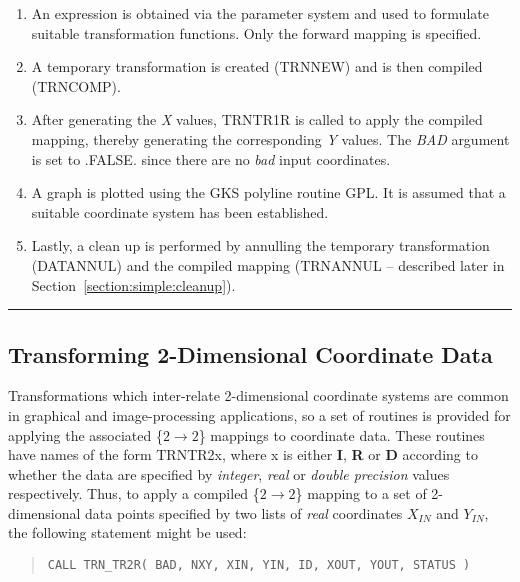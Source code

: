 \documentclass[twoside,11pt]{article}
\newcommand{\xlabel}[1]{}
\renewcommand{\_}{\texttt{\symbol{95}}}
\newcommand{\name}[1]{\mbox{\small{#1}}}
\newcommand{\fortvar}[1]{\mbox{\emph{#1}}}
\newcommand{\exampledone}[0]{\begin{center} \rule{6em}{0.2mm} \end{center}}
\begin{document}
\begin{enumerate}

\item An expression is obtained via the parameter system and used to
formulate suitable transformation functions.
Only the forward mapping is specified.

\item A temporary transformation is created (\name{TRN\_NEW}) and is then
compiled (\name{TRN\_COMP}).

\item After generating the \fortvar{X} values, \name{TRN\_TR1R} is called to
apply the compiled mapping, thereby generating the corresponding \fortvar{Y}
values.
The \fortvar{BAD} argument is set to \name{.FALSE.} since there are no {\em
bad} input coordinates.

\item A graph is plotted using the \name{GKS} polyline routine \name{GPL}.
It is assumed that a suitable coordinate system has been established.

\item Lastly, a clean up is performed by annulling the temporary
transformation (\name{DAT\_ANNUL}) and the compiled mapping
(\name{TRN\_ANNUL} -- described later in
Section~\ref{section:simple:cleanup}).

\end{enumerate}
\exampledone


\subsection{\xlabel{transforming_2dimensional_coordinate_data}Transforming 2-Dimensional Coordinate Data}

\label{section:simple:2ddata}

Transformations which inter-relate 2-dimensional coordinate systems are
common in graphical and image-processing applications, so a set of routines
is provided for applying the associated \mbox{\{$2 \rightarrow 2$\}}
mappings to coordinate data.
These routines have names of the form \name{TRN\_TR2x}, where x is either
\textbf{I}, \textbf{R} or \textbf{D} according to whether the data are
specified by
\emph{integer}, \emph{real} or \emph{double precision} values respectively.
Thus, to apply a compiled \mbox{\{$2 \rightarrow 2$\}} mapping to a set of
2-dimensional data points specified by two lists of \emph{real} coordinates
$X_{IN}$ and $Y_{IN}$, the following statement might be used:

\begin{quote}
\begin{verbatim}
CALL TRN_TR2R( BAD, NXY, XIN, YIN, ID, XOUT, YOUT, STATUS )
\end{verbatim}
\end{quote}
\end{document}
